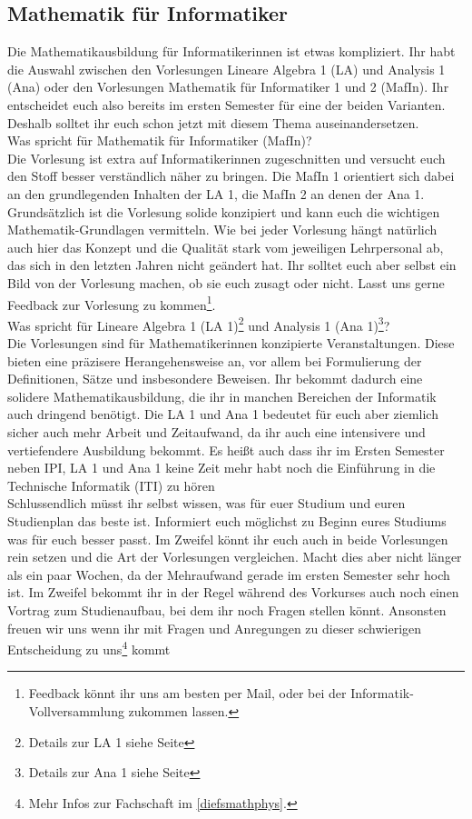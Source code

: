 \subsection{Mathematik für Informatiker}

Die Mathematikausbildung für Informatikerinnen ist etwas kompliziert. Ihr habt die Auswahl zwischen den Vorlesungen Lineare Algebra 1 (\gls{LA}) und Analysis 1 (\gls{Ana}) oder den Vorlesungen Mathematik für Informatiker 1 und 2 (\gls{MafIn}). Ihr entscheidet euch also bereits im ersten Semester für eine der beiden Varianten. Deshalb solltet ihr euch schon jetzt mit diesem Thema auseinandersetzen.\\

Was spricht für Mathematik für Informatiker (MafIn)?\\
Die Vorlesung ist extra auf Informatikerinnen zugeschnitten und versucht euch den Stoff besser verständlich näher zu bringen. Die MafIn 1 orientiert sich dabei an den grundlegenden Inhalten der LA 1, die MafIn 2 an denen der Ana 1. Grundsätzlich ist die Vorlesung solide konzipiert und kann euch die wichtigen Mathematik-Grundlagen vermitteln. Wie bei jeder Vorlesung hängt natürlich auch hier das Konzept und die Qualität stark vom jeweiligen Lehrpersonal ab, das sich in den letzten Jahren nicht geändert hat. Ihr solltet euch aber selbst ein Bild von der Vorlesung machen, ob sie euch zusagt oder nicht. Lasst uns gerne Feedback zur Vorlesung zu kommen\footnote{Feedback könnt ihr uns am besten per Mail, oder bei der Informatik-Vollversammlung zukommen lassen.}.\\

Was spricht für Lineare Algebra 1 (LA 1)\footnote{Details zur LA 1 siehe Seite \pageref{la1}} und Analysis 1 (Ana 1)\footnote{Details zur Ana 1 siehe Seite \pageref{ana1}}?\\
Die Vorlesungen sind für Mathematikerinnen konzipierte Veranstaltungen. Diese bieten eine präzisere Herangehensweise an, vor allem bei Formulierung der Definitionen, Sätze und insbesondere Beweisen. Ihr bekommt dadurch eine solidere Mathematikausbildung, die ihr in manchen Bereichen der Informatik auch dringend benötigt. Die LA 1 und Ana 1 bedeutet für euch aber ziemlich sicher auch mehr Arbeit und Zeitaufwand, da ihr auch eine intensivere und vertiefendere Ausbildung bekommt. Es heißt auch dass ihr im Ersten Semester neben \gls{IPI}, LA 1 und Ana 1 keine Zeit mehr habt noch die Einführung in die Technische Informatik (\gls{ITI}) zu hören\\

Schlussendlich müsst ihr selbst wissen, was für euer Studium und euren Studienplan das beste ist. Informiert euch möglichst zu Beginn eures Studiums was für euch besser passt. Im Zweifel könnt ihr euch auch in beide Vorlesungen rein setzen und die Art der Vorlesungen vergleichen. Macht dies aber nicht länger als ein paar Wochen, da der Mehraufwand gerade im ersten Semester sehr hoch ist. Im Zweifel bekommt ihr in der Regel während des Vorkurses auch noch einen Vortrag zum Studienaufbau, bei dem ihr noch Fragen stellen könnt. Ansonsten freuen wir uns wenn ihr mit Fragen und Anregungen zu dieser schwierigen Entscheidung zu uns\footnote{Mehr Infos zur Fachschaft im \autoref{diefsmathphys}.} kommt

